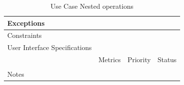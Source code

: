 \begin{table}[H]
\begin{tabularx}{\linewidth}{|l|X|X|X|}
            \hline Exceptions                    & \multicolumn{3}{l|}{}                                                                                 \\

            \hline Constraints                   & \multicolumn{3}{l|}{}                                                                                 \\

            \hline User Interface Specifications & \multicolumn{3}{l|}{}                                                                                 \\

            \hline \multirow{2}{*}{}             & Metrics                                                                           & Priority & Status \\
            \cline{2-4}                          &                                                                                   &          &        \\
            \hline Notes                         & \multicolumn{3}{l|}{}                                                                                 \\
            \hline
      \end{tabularx}
      \caption{Use Case Nested operations}
      \label{tab:use_case_nested_operations}
\end{table}

